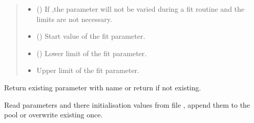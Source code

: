 \documentclass[letterpaper,10pt,english]{sphinxmanual}
\begin{document}
\begin{fulllineitems}
\begin{fulllineitems}
\begin{quote}
\begin{description}
\begin{itemize}
\item {} 
 () \textendash{} If ,the parameter will not be varied during a fit routine and the limits are not necessary.

\item {} 
 () \textendash{} Start value of the fit parameter.

\item {} 
 () \textendash{} Lower limit of the fit parameter.

\item {} 
 \textendash{} Upper limit of the fit parameter.

\end{itemize}

\end{description}\end{quote}

\end{fulllineitems}


\begin{fulllineitems}
\label{\detokenize{modules-api/parameters:Parameters.ParameterPool.getParameter}}
Return existing parameter with name  or return  if not existing.

\end{fulllineitems}


\begin{fulllineitems}
\label{\detokenize{modules-api/parameters:Parameters.ParameterPool.readFromFile}}
Read parameters and there initialisation values from file , append them to the pool or overwrite existing once.


\end{fulllineitems}
\end{fulllineitems}
\end{document}
